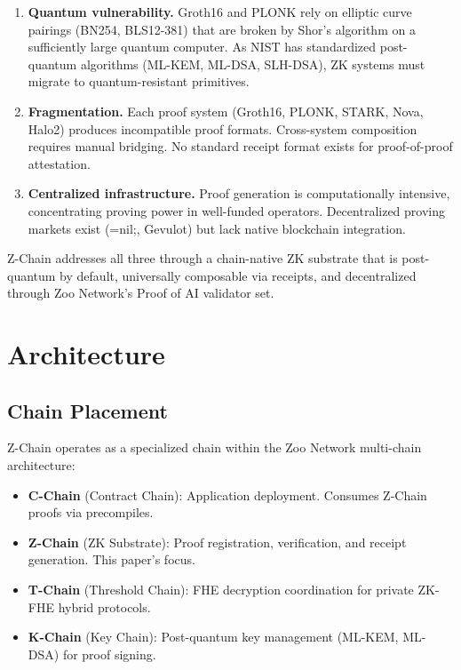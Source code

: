 \documentclass[11pt,a4paper]{article}
\begin{document}
\begin{enumerate}
\item \textbf{Quantum vulnerability.} Groth16 and PLONK rely on elliptic curve pairings (BN254, BLS12-381) that are broken by Shor's algorithm on a sufficiently large quantum computer. As NIST has standardized post-quantum algorithms (ML-KEM, ML-DSA, SLH-DSA), ZK systems must migrate to quantum-resistant primitives.

\item \textbf{Fragmentation.} Each proof system (Groth16, PLONK, STARK, Nova, Halo2) produces incompatible proof formats. Cross-system composition requires manual bridging. No standard receipt format exists for proof-of-proof attestation.

\item \textbf{Centralized infrastructure.} Proof generation is computationally intensive, concentrating proving power in well-funded operators. Decentralized proving markets exist (=nil;, Gevulot) but lack native blockchain integration.
\end{enumerate}

Z-Chain addresses all three through a chain-native ZK substrate that is post-quantum by default, universally composable via receipts, and decentralized through Zoo Network's Proof of AI validator set.

\section{Architecture}

\subsection{Chain Placement}

Z-Chain operates as a specialized chain within the Zoo Network multi-chain architecture:

\begin{itemize}
\item \textbf{C-Chain} (Contract Chain): Application deployment. Consumes Z-Chain proofs via precompiles.
\item \textbf{Z-Chain} (ZK Substrate): Proof registration, verification, and receipt generation. This paper's focus.
\item \textbf{T-Chain} (Threshold Chain): FHE decryption coordination for private ZK-FHE hybrid protocols.
\item \textbf{K-Chain} (Key Chain): Post-quantum key management (ML-KEM, ML-DSA) for proof signing.
\end{itemize}
\end{document}
